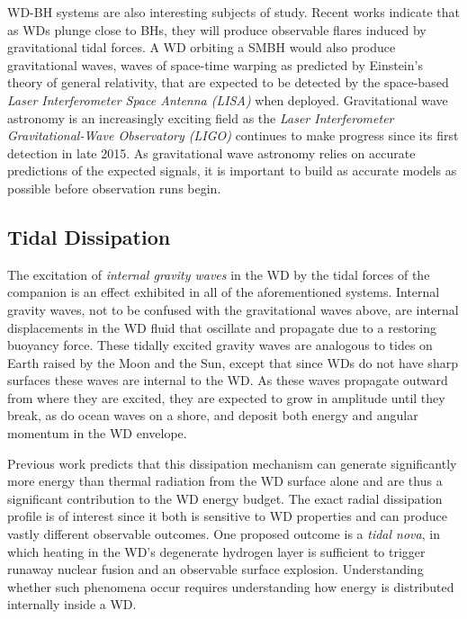 \documentclass[11pt,
        usenames, %
        dvipsnames %
    ]{article}
\begin{document}
WD-BH systems are also interesting subjects of study. Recent works indicate that
as WDs plunge close to BHs, they will produce observable flares induced by
gravitational tidal forces\cite{flares}. A WD orbiting a SMBH would also produce
gravitational waves, waves of space-time warping as predicted by Einstein's
theory of general relativity, that are expected to be detected by the
space-based \emph{Laser Interferometer Space Antenna (LISA)} when
deployed\cite{lisa}. Gravitational wave astronomy is an increasingly exciting
field as the \emph{Laser Interferometer Gravitational-Wave Observatory (LIGO)}
continues to make progress since its first detection in late 2015. As
gravitational wave astronomy relies on accurate predictions of the expected
signals, it is important to build as accurate models as possible before
observation runs begin.

\subsection{Tidal Dissipation}

The excitation of \emph{internal gravity waves} in the WD by the tidal forces of
the companion is an effect exhibited in all of the aforementioned systems.
Internal gravity waves, not to be confused with the gravitational waves above,
are internal displacements in the WD fluid that oscillate and propagate due to a
restoring buoyancy force. These tidally excited gravity waves are analogous to
tides on Earth raised by the Moon and the Sun, except that since WDs do not have
sharp surfaces these waves are internal to the WD\@. As these waves propagate
outward from where they are excited, they are expected to grow in amplitude
until they break, as do ocean waves on a shore, and deposit both energy and
angular momentum in the WD envelope.

Previous work predicts that this dissipation mechanism can generate
significantly more energy than thermal radiation from the WD surface alone and
are thus a significant contribution to the WD energy budget\cite{fullerII}. The
exact radial dissipation profile is of interest since it both is sensitive to WD
properties and can produce vastly different observable outcomes. One proposed
outcome is a \emph{tidal nova}, in which heating in the WD's degenerate hydrogen
layer is sufficient to trigger runaway nuclear fusion and an observable
surface explosion\cite{tidal_novae}. Understanding whether such phenomena occur
requires understanding how energy is distributed internally inside a WD\@.
\end{document}

